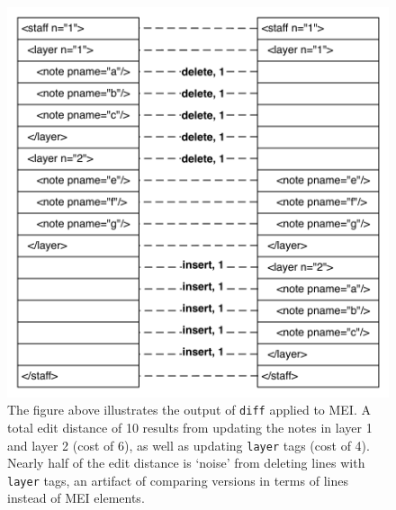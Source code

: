 \documentclass{article}
\newcommand{\code}[1]{\texttt{#1}}
\begin{document}
\begin{figure}[ht]
\centering
\includegraphics[scale=0.5]{figures/lcs-diff.pdf}
\caption{The figure above illustrates the output of \code{diff}
  applied to MEI.  A total edit distance of 10 results from updating
  the notes in layer 1 and layer 2 (cost of 6), as well as updating
  \code{layer} tags (cost of 4).  Nearly half of the edit distance is
  `noise' from deleting lines with \code{layer} tags, an artifact of
  comparing versions in terms of lines instead of MEI elements.}
\label{fig:lcs-diff}
\end{figure}
\end{document}
